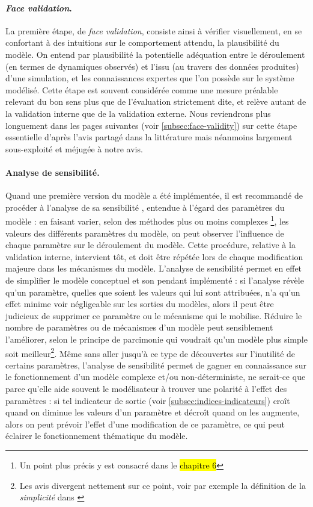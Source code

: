 \paragraph{\og \textit{Face validation}\fg{}.}
La première étape, de \og \textit{face validation}\fg{}, consiste ainsi à vérifier visuellement, en se confortant à des intuitions sur le comportement attendu, la plausibilité du modèle.
On entend par plausibilité la potentielle adéquation entre le déroulement (en termes de dynamiques observés) et l'issu (au travers des données produites) d'une simulation, et les connaissances expertes que l'on possède sur le système modélisé.
Cette étape est souvent considérée comme une mesure préalable relevant du bon sens plus que de l'évaluation strictement dite, et relève autant de la validation interne que de la validation externe.
Nous reviendrons plus longuement dans les pages suivantes (voir \cref{subsec:face-validity}) sur cette étape essentielle d'après l'avis partagé dans la littérature mais néanmoins largement sous-exploité et méjugée à notre avis.

\paragraph{Analyse de sensibilité.}
Quand une première version du modèle a été implémentée, il est recommandé de procéder à l'analyse de sa \og sensibilité \fg{}, entendue à l'égard des paramètres du modèle : en faisant varier, selon des méthodes plus ou moins complexes
\footnote{
	Un point plus précis y est consacré dans le \hl{chapitre 6}
}, les valeurs des différents paramètres du modèle, on peut observer l'influence de chaque paramètre sur le déroulement du modèle.
Cette procédure, relative à la validation interne, intervient tôt, et doit être répétée lors de chaque modification majeure dans les mécanismes du modèle.
L'analyse de sensibilité permet en effet de simplifier le modèle conceptuel et son pendant implémenté :
	si l'analyse révèle qu'un paramètre, quelles que soient les valeurs qui lui sont attribuées, n'a qu'un effet minime voir négligeable sur les sorties du modèles, alors il peut être judicieux de supprimer ce paramètre ou le mécanisme qui le mobilise.
Réduire le nombre de paramètres ou de mécanismes d'un modèle peut sensiblement l'améliorer, selon le principe de parcimonie qui voudrait qu'un modèle plus simple soit meilleur\footnote{
	Les avis divergent nettement sur ce point, voir par exemple la définition de la \textit{simplicité} dans \textcite[120]{amblard_evaluation_2006}
}.
Même sans aller jusqu'à ce type de découvertes sur l'inutilité de certains paramètres, l'analyse de sensibilité permet de gagner en connaissance sur le fonctionnement d'un modèle complexe et/ou non-déterministe, ne serait-ce que parce qu'elle aide souvent le modélisateur à trouver une \og polarité \fg{} à l'effet des paramètres :
	si tel indicateur de sortie (voir \cref{subsec:indices-indicateurs}) croît quand on diminue les valeurs d'un paramètre et décroît quand on les augmente, alors on peut prévoir l'effet d'une modification de ce paramètre, ce qui peut éclairer le fonctionnement thématique du modèle.

